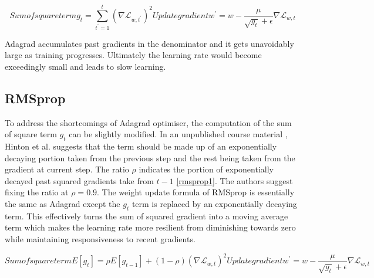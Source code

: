 \documentclass[11pt]{article} %
\theoremstyle{plain}
\theoremstyle{definition}
\begin{document}
\begin{appendices}
	\begin{subequations} 	
		Sum of square term
		\begin{equation}
		\label{adagrad1}
		g_t=\sum_{t^\prime=1}^{t}(\nabla\mathcal{L}_{w,t^\prime})^2
		\end{equation}
		
		Update gradient
		\begin{equation}
		\label{adagrad2}
		w^\prime=w-\frac{\mu}{\sqrt{g_t}+\epsilon}\nabla\mathcal{L}_{w,t}
		\end{equation}
	\end{subequations}
	
	Adagrad accumulates past gradients in the denominator and it gets unavoidably large as training progresses. Ultimately the learning rate would become exceedingly small and leads to slow learning.
		
	\subsection{RMSprop}
	To address the shortcomings of Adagrad optimiser, the computation of the sum of square term \(g_t\) can be slightly modified. In an unpublished course material \cite{hinton2012unpub}, Hinton et al. suggests that the term should be made up of an exponentially decaying portion taken from the previous step and the rest being taken from the gradient at current step. The ratio \(\rho\) indicates the portion of exponentially decayed past squared gradients take from \(t-1\) \eqref{rmsprop1}. The authors suggest fixing the ratio at \(\rho=0.9\). The weight update formula of RMSprop is essentially the same as Adagrad except the \(g_t\) term is replaced by an exponentially decaying term. This effectively turns the sum of squared gradient into a moving average term which makes the learning rate more resilient from diminishing towards zero while maintaining responsiveness to recent gradients. 
	
	\begin{subequations} 
		
		Sum of square term
		\begin{equation}
		\label{rmsprop1}
		E[g_t]=\rho E[g_{t-1}]+(1-\rho)(\nabla \mathcal{L}_{w,t})^2
		\end{equation}
		
		Update gradient
		\begin{equation}
		\label{rmsprop2}
		w^\prime=w-\frac{\mu}{\sqrt{g_t}+\epsilon}\nabla \mathcal{L}_{w,t}
		\end{equation}
		

\end{subequations}
\end{appendices}
\end{document}
